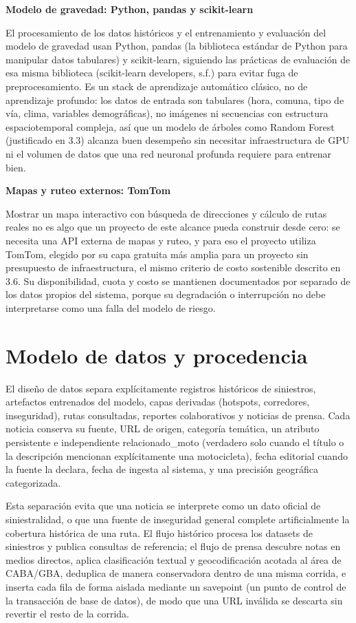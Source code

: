 \textbf{Modelo de gravedad: Python, pandas y scikit-learn}

El procesamiento de los datos históricos y el entrenamiento y evaluación
del modelo de gravedad usan Python, pandas (la biblioteca estándar de
Python para manipular datos tabulares) y scikit-learn, siguiendo las
prácticas de evaluación de esa misma biblioteca (scikit-learn
developers, s.f.) para evitar fuga de preprocesamiento. Es un stack de
aprendizaje automático clásico, no de aprendizaje profundo: los datos de
entrada son tabulares (hora, comuna, tipo de vía, clima, variables
demográficas), no imágenes ni secuencias con estructura espaciotemporal
compleja, así que un modelo de árboles como Random Forest (justificado
en 3.3) alcanza buen desempeño sin necesitar infraestructura de GPU ni
el volumen de datos que una red neuronal profunda requiere para entrenar
bien.

\textbf{Mapas y ruteo externos: TomTom}

Mostrar un mapa interactivo con búsqueda de direcciones y cálculo de
rutas reales no es algo que un proyecto de este alcance pueda construir
desde cero: se necesita una API externa de mapas y ruteo, y para eso el
proyecto utiliza TomTom, elegido por su capa gratuita más amplia para un
proyecto sin presupuesto de infraestructura, el mismo criterio de costo
sostenible descrito en 3.6. Su disponibilidad, cuota y costo se
mantienen documentados por separado de los datos propios del sistema,
porque su degradación o interrupción no debe interpretarse como una
falla del modelo de riesgo.

\section{Modelo de datos y procedencia}

El diseño de datos separa explícitamente registros históricos de
siniestros, artefactos entrenados del modelo, capas derivadas (hotspots,
corredores, inseguridad), rutas consultadas, reportes colaborativos y
noticias de prensa. Cada noticia conserva su fuente, URL de origen,
categoría temática, un atributo persistente e independiente
relacionado\_moto (verdadero solo cuando el título o la descripción
mencionan explícitamente una motocicleta), fecha editorial cuando la
fuente la declara, fecha de ingesta al sistema, y una precisión
geográfica categorizada.

Esta separación evita que una noticia se interprete como un dato oficial
de siniestralidad, o que una fuente de inseguridad general complete
artificialmente la cobertura histórica de una ruta. El flujo histórico
procesa los datasets de siniestros y publica consultas de referencia; el
flujo de prensa descubre notas en medios directos, aplica clasificación
textual y geocodificación acotada al área de CABA/GBA, deduplica de
manera conservadora dentro de una misma corrida, e inserta cada fila de
forma aislada mediante un savepoint (un punto de control de la
transacción de base de datos), de modo que una URL inválida se descarta
sin revertir el resto de la corrida.

